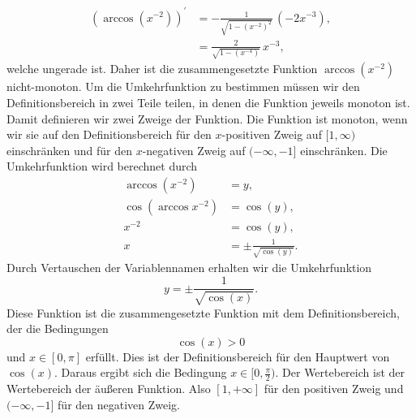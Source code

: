 {\begin{iii}
\begin{align*}
\left(\arccos(x^{-2})\right)^\prime & = -\frac{1}{\sqrt{1-(x^{-2})^2}}\, (-2 x^{-3}),\\
& = \frac{2}{\sqrt{1-(x^{-4})}}\, x^{-3},
\end{align*}
welche ungerade ist. Daher ist die zusammengesetzte Funktion $\arccos(x^{-2})$ nicht-monoton. Um die Umkehrfunktion zu bestimmen m\"ussen wir den Definitionsbereich
in zwei Teile teilen, in denen die Funktion jeweils monoton ist. Damit definieren wir zwei Zweige der Funktion. Die Funktion ist monoton, wenn wir sie auf den Definitionsbereich 
f\"ur den $x$-positiven Zweig auf $[1, \infty)$ einschr\"anken und f\"ur den $x$-negativen Zweig auf $(-\infty, -1]$ einschr\"anken. 
Die Umkehrfunktion wird berechnet durch
\begin{align*}
\arccos(x^{-2}) &= y,\\
\cos(\arccos{x^{-2}}) & = \cos(y),\\
x^{-2} & = \cos(y),\\
x & = \pm \frac{1}{\sqrt{\cos(y)}}.
\end{align*}
Durch Vertauschen der Variablennamen erhalten wir die Umkehrfunktion
$$
y = \pm \frac{1}{\sqrt{\cos(x)}}.
$$
Diese Funktion ist die zusammengesetzte Funktion mit dem Definitionsbereich, der die Bedingungen $$\cos(x)>0$$ und $x\in [0, \pi]$ erf\"ullt. 
Dies ist der Definitionsbereich f\"ur den Hauptwert von $\cos(x)$. Daraus ergibt sich die Bedingung $x\in [0,\frac{\pi}{2})$.  Der Wertebereich ist der Wertebereich der \"au\ss eren Funktion.
Also $[1, +\infty]$ f\"ur den positiven Zweig und  $(-\infty, -1]$ f\"ur den negativen Zweig.
\end{iii}
}

